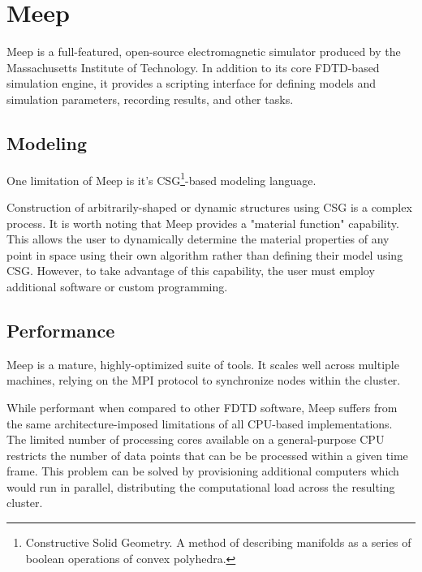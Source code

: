 \chapter{Meep} \label{ch:meep}

Meep\cite{OskooiRo10} is a full-featured, open-source electromagnetic simulator produced by the Massachusetts Institute of Technology. In addition to its core FDTD-based simulation engine, it provides a scripting interface for defining models and simulation parameters, recording results, and other tasks.  





\section{Modeling}

\iffalse
************************************************
While I may agree, you need to keep they hyperbole and sarcasm out.  You should re-write this section to state what Meep is, how it is used, and how you made use of some of it's features.  You can also look up how many citations it has (on their website) to showcase that it's widely used and trusted making it a valid point of comparison 
************************************************
\fi

One limitation of Meep is it's CSG\footnote{Constructive Solid Geometry. A method of describing manifolds as a series of boolean operations of convex polyhedra.}-based modeling language. 

Construction of arbitrarily-shaped or dynamic structures using CSG is a complex process. It is worth noting that Meep provides a "material function" capability. This allows the user to dynamically determine the material properties of any point in space using their own algorithm rather than defining their model using CSG. However, to take advantage of this capability, the user must employ additional software or custom programming. 

\section{Performance}

Meep is a mature, highly-optimized suite of tools. It scales well across multiple machines, relying on the MPI protocol to synchronize nodes within the cluster.

While performant when compared to other FDTD software, Meep suffers from the same architecture-imposed limitations of all CPU-based implementations. The limited number of processing cores available on a general-purpose CPU restricts the number of data points that can be be processed within a given time frame. This problem can be solved by provisioning additional computers which would run in parallel, distributing the computational load across the resulting cluster.

